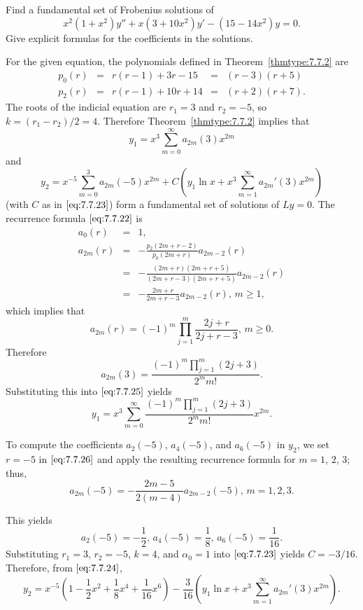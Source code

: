 \documentclass{ximera}
\begin{document}
\begin{example}\label{example:7.7.3}
Find a fundamental set of Frobenius  solutions of
$$
x^2(1+x^2)y''+x(3+10x^2)y'-(15-14x^2)y=0.
$$
Give explicit  formulas for the coefficients in the solutions.

\begin{explanation}
For  the given equation, the polynomials defined in
Theorem~\ref{thmtype:7.7.2} are
$$
\begin{array}{ccccc}
p_0(r)&=&r(r-1)+3r-15&=&(r-3)(r+5)\\
p_2(r)&=&r(r-1)+10r+14&=&(r+2)(r+7).
\end{array}
$$
The roots of the indicial equation are $r_1=3$ and $r_2=-5$,
so $k=(r_1-r_2)/2=4$. Therefore Theorem~\ref{thmtype:7.7.2} implies that
\begin{equation} \label{eq:7.7.25}
y_1=x^3\sum_{m=0}^\infty a_{2m}(3)x^{2m}
\end{equation}
and
$$
y_2=x^{-5}\sum_{m=0}^3 a_{2m}(-5)x^{2m}+C
\left(y_1\ln x+x^3\sum_{m=1}^\infty a_{2m}'(3)x^{2m}\right)
$$
(with $C$ as in $\eqref{eq:7.7.23}$)
form a fundamental set of solutions of $Ly=0$. The recurrence formula
$\eqref{eq:7.7.22}$ is
\begin{equation} \label{eq:7.7.26}
\begin{array}{ccl}
a_0(r)&=&1,\\
a_{2m}(r)&=&-\frac{p_2(2m+r-2)}{p_0(2m+r)}a_{2m-2}(r)\\
&=&-\frac{(2m+r)(2m+r+5)}{(2m+r-3)(2m+r+5)}a_{2m-2}(r)\\
&=&-\frac{2m+r}{2m+r-3}a_{2m-2}(r),\,m\geq 1,
\end{array}
\end{equation}
which implies that
\begin{equation} \label{eq:7.7.27}
a_{2m}(r)=(-1)^m\prod_{j=1}^m\frac{2j+r}{2j+r-3},\,m\geq 0.
\end{equation}
Therefore
\begin{equation} \label{eq:7.7.28}
a_{2m}(3)=\frac{(-1)^m\prod_{j=1}^m(2j+3)}{2^mm!}.
\end{equation}
Substituting this into $\eqref{eq:7.7.25}$ yields
$$
y_1=x^3\sum_{m=0}^\infty
\frac{(-1)^m\prod_{j=1}^m(2j+3)}{2^mm!}x^{2m}.
$$

To compute the coefficients $a_2(-5)$, $a_4(-5)$, and $a_6(-5)$ in
$y_2$, we
set $r=-5$ in $\eqref{eq:7.7.26}$ and apply the resulting recurrence
formula for $m=1$, $2$,  $3$;   thus,
$$
a_{2m}(-5)=-\frac{2m-5}{2(m-4)}a_{2m-2}(-5),\,m=1,2,3.
$$

This yields
$$
a_2(-5)=-\frac{1}{2},\,a_4(-5)=\frac{1}{8},\,a_6(-5)=\frac{1}{16}.
$$
Substituting $r_1=3$, $r_2=-5$, $k=4$, and $\alpha_0=1$ into
$\eqref{eq:7.7.23}$
yields $C=-3/16$.   Therefore, from $\eqref{eq:7.7.24}$,
\begin{equation} \label{eq:7.7.29}
y_2=x^{-5} \left(1-\frac{1}{2}x^2+\frac{1}{8}x^4+\frac{1}{16}x^6\right)
-\frac{3}{16}
\left(y_1\ln x+x^3\sum_{m=1}^\infty a_{2m}'(3)x^{2m}\right).
\end{equation}


\end{explanation}
\end{example}
\end{document}
